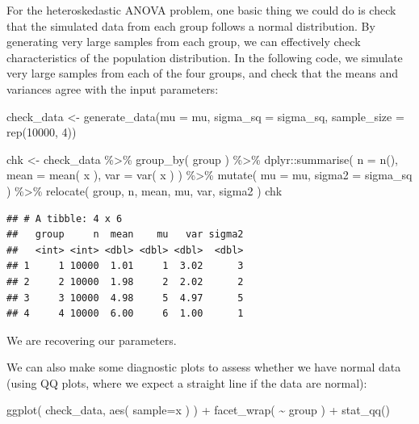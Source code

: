 \documentclass[
]{book}
\newenvironment{Shaded}{\begin{snugshade}}{\end{snugshade}}
\newcommand{\AttributeTok}[1]{\textcolor[rgb]{0.77,0.63,0.00}{#1}}
\newcommand{\DecValTok}[1]{\textcolor[rgb]{0.00,0.00,0.81}{#1}}
\newcommand{\FunctionTok}[1]{\textcolor[rgb]{0.00,0.00,0.00}{#1}}
\newcommand{\NormalTok}[1]{#1}
\newcommand{\OtherTok}[1]{\textcolor[rgb]{0.56,0.35,0.01}{#1}}
\newcommand{\SpecialCharTok}[1]{\textcolor[rgb]{0.00,0.00,0.00}{#1}}
\begin{document}
For the heteroskedastic ANOVA problem, one basic thing we could do is check that the simulated data from each group follows a normal distribution. By generating very large samples from each group, we can effectively check characteristics of the population distribution.
In the following code, we simulate very large samples from each of the four groups, and check that the means and variances agree with the input parameters:

\begin{Shaded}
\begin{Highlighting}[]
\NormalTok{check\_data }\OtherTok{\textless{}{-}} \FunctionTok{generate\_data}\NormalTok{(}\AttributeTok{mu =}\NormalTok{ mu, }\AttributeTok{sigma\_sq =}\NormalTok{ sigma\_sq,}
                            \AttributeTok{sample\_size =} \FunctionTok{rep}\NormalTok{(}\DecValTok{10000}\NormalTok{, }\DecValTok{4}\NormalTok{))}

\NormalTok{chk }\OtherTok{\textless{}{-}}\NormalTok{ check\_data }\SpecialCharTok{\%\textgreater{}\%} \FunctionTok{group\_by}\NormalTok{( group ) }\SpecialCharTok{\%\textgreater{}\%}
\NormalTok{  dplyr}\SpecialCharTok{::}\FunctionTok{summarise}\NormalTok{( }\AttributeTok{n =} \FunctionTok{n}\NormalTok{(),}
             \AttributeTok{mean =} \FunctionTok{mean}\NormalTok{( x ),}
             \AttributeTok{var =} \FunctionTok{var}\NormalTok{( x ) ) }\SpecialCharTok{\%\textgreater{}\%}
  \FunctionTok{mutate}\NormalTok{( }\AttributeTok{mu =}\NormalTok{ mu,}
          \AttributeTok{sigma2 =}\NormalTok{ sigma\_sq ) }\SpecialCharTok{\%\textgreater{}\%}
  \FunctionTok{relocate}\NormalTok{( group, n, mean, mu, var, sigma2 )}
\NormalTok{chk}
\end{Highlighting}
\end{Shaded}

\begin{verbatim}
## # A tibble: 4 x 6
##   group     n  mean    mu   var sigma2
##   <int> <int> <dbl> <dbl> <dbl>  <dbl>
## 1     1 10000  1.01     1  3.02      3
## 2     2 10000  1.98     2  2.02      2
## 3     3 10000  4.98     5  4.97      5
## 4     4 10000  6.00     6  1.00      1
\end{verbatim}

We are recovering our parameters.

We can also make some diagnostic plots to assess whether we have normal data (using QQ plots, where we expect a straight line if the data are normal):

\begin{Shaded}
\begin{Highlighting}[]
\FunctionTok{ggplot}\NormalTok{( check\_data, }\FunctionTok{aes}\NormalTok{( }\AttributeTok{sample=}\NormalTok{x ) ) }\SpecialCharTok{+}
  \FunctionTok{facet\_wrap}\NormalTok{( }\SpecialCharTok{\textasciitilde{}}\NormalTok{ group ) }\SpecialCharTok{+}
  \FunctionTok{stat\_qq}\NormalTok{()}
\end{Highlighting}
\end{Shaded}
\end{document}
